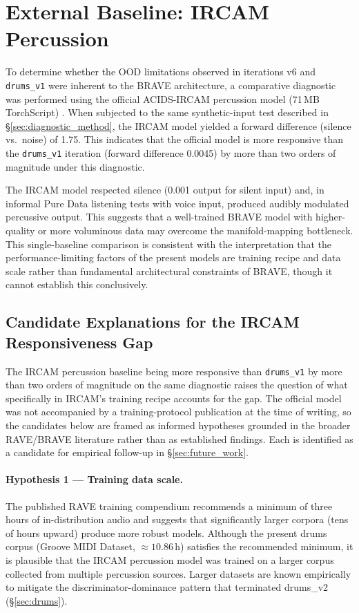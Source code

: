 \documentclass[a4paper,11pt,oneside,openany]{book}
\begin{document}
\section{External Baseline: IRCAM Percussion}\label{sec:ircam_baseline}

To determine whether the OOD limitations observed in iterations v6 and \texttt{drums\_v1} were inherent to the BRAVE architecture, a comparative diagnostic was performed using the official ACIDS-IRCAM percussion model (71\,MB TorchScript) \parencite{acidsircam2024models}. When subjected to the same synthetic-input test described in \S\ref{sec:diagnostic_method}, the IRCAM model yielded a forward difference (silence vs.~noise) of 1.75. This indicates that the official model is more responsive than the \texttt{drums\_v1} iteration (forward difference 0.0045) by more than two orders of magnitude under this diagnostic.

The IRCAM model respected silence (0.001 output for silent input) and, in informal Pure Data listening tests with voice input, produced audibly modulated percussive output. This suggests that a well-trained BRAVE model with higher-quality or more voluminous data may overcome the manifold-mapping bottleneck. This single-baseline comparison is consistent with the interpretation that the performance-limiting factors of the present models are training recipe and data scale rather than fundamental architectural constraints of BRAVE, though it cannot establish this conclusively.

\subsection{Candidate Explanations for the IRCAM Responsiveness Gap}\label{sec:ircam_hypothesis}

The IRCAM percussion baseline being more responsive than \texttt{drums\_v1} by more than two orders of magnitude on the same diagnostic raises the question of what specifically in IRCAM's training recipe accounts for the gap. The official model was not accompanied by a training-protocol publication at the time of writing, so the candidates below are framed as informed hypotheses grounded in the broader RAVE/BRAVE literature rather than as established findings. Each is identified as a candidate for empirical follow-up in \S\ref{sec:future_work}.

\paragraph{Hypothesis 1 --- Training data scale.} The published RAVE training compendium recommends a minimum of three hours of in-distribution audio and suggests that significantly larger corpora (tens of hours upward) produce more robust models. Although the present drums corpus (Groove MIDI Dataset, $\approx 10.86$\,h) satisfies the recommended minimum, it is plausible that the IRCAM percussion model was trained on a larger corpus collected from multiple percussion sources. Larger datasets are known empirically to mitigate the discriminator-dominance pattern that terminated drums\_v2 (\S\ref{sec:drums}).
\end{document}
